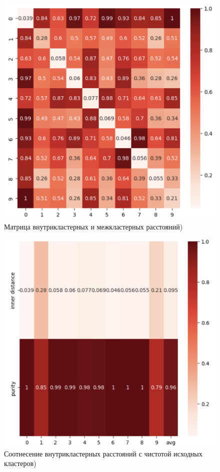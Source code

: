 \begin{figure}
	\begin{center}
		\includegraphics[width=\textwidth]{images/2.png}
	\end{center}
	\caption{Матрица внутрикластерных и межкластерных расстояний)}
	\label{img:2}
\end{figure}

\begin{figure}
	\begin{center}
		\includegraphics[width=\textwidth]{images/3.png}
	\end{center}
	\caption{Соотнесение внутрикластерных расстояний с чистотой исходных кластеров)}
	\label{img:3}
\end{figure}

